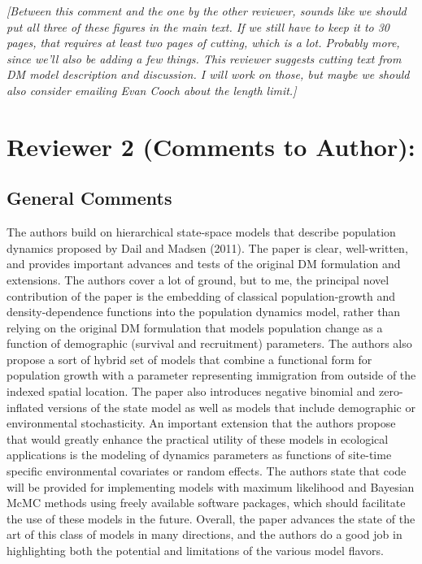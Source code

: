 \documentclass[12pt,english]{article}
\begin{document}
\begin{spacing}{1.9}
\begin{flushleft}
\vspace{0.5cm}
\textit{[Between this comment and the one by the other reviewer, sounds like we should 
put all three of these figures in the main text.  If we still have to keep it to 30 pages,
that requires at least two pages of cutting, which is a lot.  Probably more, since we'll also 
be adding a few things.  This reviewer suggests cutting
text from DM model description and discussion.  I will work on those, but maybe we
should also consider emailing Evan Cooch about the length limit.]}
\vspace{0.5cm}


\section*{Reviewer 2 (Comments to Author):} 
\label{sec:rev2}
\subsection*{General Comments}
The authors build on hierarchical state-space models that describe population
dynamics proposed by Dail and Madsen (2011). The paper is clear, well-written,
and provides important advances and tests of the original DM formulation and
extensions. The authors cover a lot of ground, but to me, the principal novel
contribution of the paper is the embedding of classical population-growth and
density-dependence functions into the population dynamics model, rather than
relying on the original DM formulation that models population change as a
function of demographic (survival and recruitment) parameters. The authors also
propose a sort of hybrid set of models that combine a functional form for
population growth with a parameter representing immigration from outside of the
indexed spatial location. The paper also introduces negative binomial and
zero-inflated versions of the state model as well as models that include
demographic or environmental stochasticity. An important extension that
the authors propose that would greatly enhance the practical utility of these
models in ecological applications is the modeling of dynamics parameters as
functions of site-time specific environmental covariates or random effects. The
authors state that code will be provided for implementing models with maximum
likelihood and Bayesian McMC methods using freely available software packages,
which should facilitate the use of these models in the future. Overall, the
paper advances the state of the art of this class of models in many directions,
and the authors do a good job in highlighting both the potential and limitations
of the various model flavors.


\end{flushleft}
\end{spacing}
\end{document}
